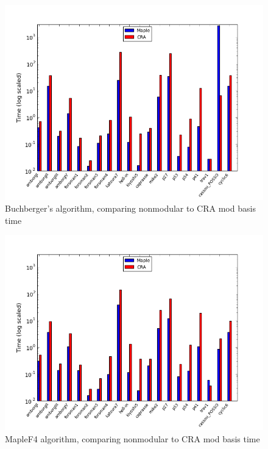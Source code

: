 \documentclass[letterpaper,12pt,titlepage,oneside,final]{book}
\begin{document}
\begin{figure}[H]
  \centering
  \includegraphics[scale=0.7]{bb_mapleVsCRA_modBasisTime.png}
  \caption{Buchberger's algorithm, comparing nonmodular to CRA mod basis time \label{fig:f4_tests}}
\end{figure}

\begin{figure}[H]
  \centering
  \includegraphics[scale=0.7]{f4_mapleVsCRA_modBasisTime.png}
  \caption{MapleF4 algorithm, comparing nonmodular to CRA mod basis time \label{fig:f4_tests}}
\end{figure}
\end{document}
